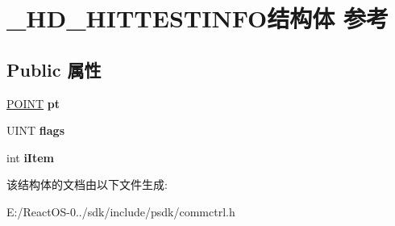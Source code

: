 \hypertarget{struct___h_d___h_i_t_t_e_s_t_i_n_f_o}{}\section{\+\_\+\+H\+D\+\_\+\+H\+I\+T\+T\+E\+S\+T\+I\+N\+F\+O结构体 参考}
\label{struct___h_d___h_i_t_t_e_s_t_i_n_f_o}
\subsection*{Public 属性}
\begin{DoxyCompactItemize}
\item 
\mbox{\label{struct___h_d___h_i_t_t_e_s_t_i_n_f_o_ab6c1602d4c7db44af7ff4ff544ca82f0}} 
\hyperlink{structtag_p_o_i_n_t}{P\+O\+I\+NT} {\bfseries pt}
\item 
\mbox{\label{struct___h_d___h_i_t_t_e_s_t_i_n_f_o_a26ac249ad38a3d781849b1c9549b2456}} 
U\+I\+NT {\bfseries flags}
\item 
\mbox{\label{struct___h_d___h_i_t_t_e_s_t_i_n_f_o_a83fafe481a75bbb59501b1c6b645f17e}} 
int {\bfseries i\+Item}
\end{DoxyCompactItemize}


该结构体的文档由以下文件生成\+:\begin{DoxyCompactItemize}
\item 
E\+:/\+React\+O\+S-\/0../sdk/include/psdk/commctrl.\+h\end{DoxyCompactItemize}
